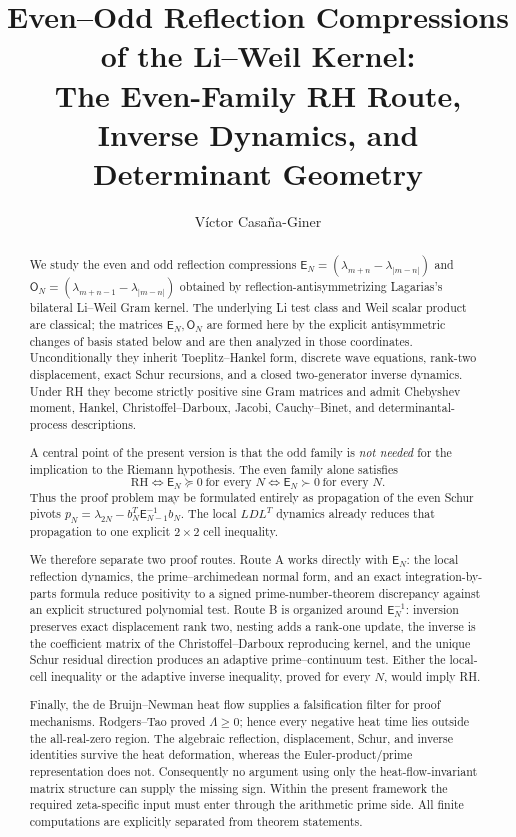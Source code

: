 \documentclass[11pt]{amsart}
\title[Reflection Compressions of the Li--Weil Kernel]{Even--Odd Reflection Compressions of the Li--Weil Kernel:\\
The Even-Family RH Route, Inverse Dynamics, and Determinant Geometry}
\author{V\'ictor Casa\~na-Giner}
\numberwithin{equation}{section}
\theoremstyle{plain}
\theoremstyle{definition}
\theoremstyle{remark}
\newcommand{\RH}{\mathrm{RH}}
\begin{document}
\begin{abstract}
We study the even and odd reflection compressions
\(\mathsf E_N=(\lambda_{m+n}-\lambda_{|m-n|})\) and
\(\mathsf O_N=(\lambda_{m+n-1}-\lambda_{|m-n|})\) obtained by reflection-antisymmetrizing
Lagarias's bilateral Li--Weil Gram kernel.  The underlying Li test class and Weil scalar product are
classical; the matrices \(\mathsf E_N,\mathsf O_N\) are formed here by the explicit
antisymmetric changes of basis stated below and are then analyzed in those coordinates.  Unconditionally they inherit Toeplitz--Hankel form, discrete wave equations,
rank-two displacement, exact Schur recursions, and a closed two-generator inverse dynamics.  Under
RH they become strictly positive sine Gram matrices and admit Chebyshev moment, Hankel,
Christoffel--Darboux, Jacobi, Cauchy--Binet, and determinantal-process descriptions.

A central point of the present version is that the odd family is \emph{not needed} for the implication
to the Riemann hypothesis.  The even family alone satisfies
\[
\RH\Longleftrightarrow \mathsf E_N\succeq0\ \text{for every }N
\Longleftrightarrow \mathsf E_N\succ0\ \text{for every }N.
\]
Thus the proof problem may be formulated entirely as propagation of the even Schur pivots
\(p_N=\lambda_{2N}-b_N^T\mathsf E_{N-1}^{-1}b_N\).  The local \(LDL^T\) dynamics already reduces
that propagation to one explicit \(2\times2\) cell inequality.

We therefore separate two proof routes.  Route A works directly with \(\mathsf E_N\): the local
reflection dynamics, the prime--archimedean normal form, and an exact integration-by-parts formula
reduce positivity to a signed prime-number-theorem discrepancy against an explicit structured
polynomial test.  Route B is organized around \(\mathsf E_N^{-1}\): inversion preserves exact
displacement rank two, nesting adds a rank-one update, the inverse is the coefficient matrix of the
Christoffel--Darboux reproducing kernel, and the unique Schur residual direction produces an
adaptive prime--continuum test.  Either the local-cell inequality or the adaptive inverse inequality,
proved for every \(N\), would imply RH.

Finally, the de Bruijn--Newman heat flow supplies a falsification filter for proof mechanisms.
Rodgers--Tao proved \(\Lambda\ge0\); hence every negative heat time lies outside the all-real-zero
region.  The algebraic reflection, displacement, Schur, and inverse identities survive the heat
deformation, whereas the Euler-product/prime representation does not.  Consequently no argument
using only the heat-flow-invariant matrix structure can supply the missing sign.  Within the present
framework the required zeta-specific input must enter through the arithmetic prime side.
All finite computations are explicitly separated from theorem statements.
\end{abstract}
\end{document}
